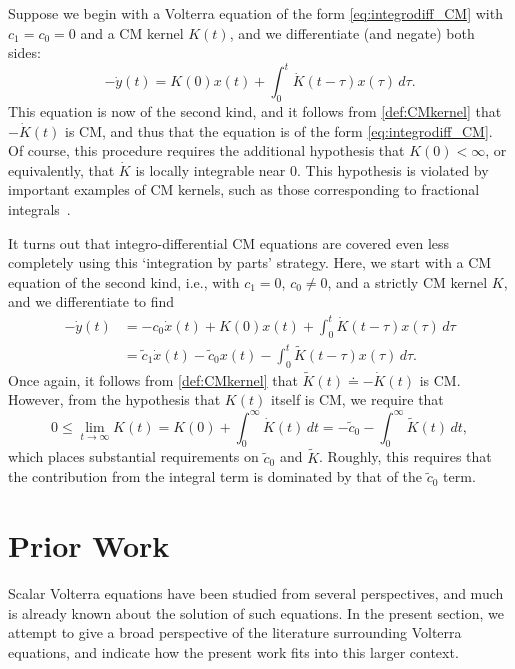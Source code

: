\documentclass{cams-l} %
\theoremstyle{definition}
\theoremstyle{remark}
\numberwithin{equation}{section}
\begin{document}
Suppose we begin with a Volterra equation of the form \ref{eq:integrodiff_CM} with $c_1 = c_0 = 0$ and a CM kernel $K(t)$, and we differentiate (and negate) both sides:
\begin{equation*}
    -\dot{y}(t) = K(0)x(t) + \int_{0}^t \dot{K}(t-\tau)x(\tau)\,d\tau.
\end{equation*}
This equation is now of the second kind, and it follows from \cref{def:CMkernel} that $-\dot{K}(t)$ is CM, and thus that the equation is of the form \ref{eq:integrodiff_CM}. Of course, this procedure requires the additional hypothesis that $K(0)<\infty$, or equivalently, that $\dot{K}$ is locally integrable near $0$. This hypothesis is violated by important examples of CM kernels, such as those corresponding to fractional integrals~\cite{2014fcip.book.....H}.

It turns out that integro-differential CM equations are covered even less completely using this `integration by parts' strategy. Here, we start with a CM equation of the second kind, i.e., with $c_1=0$, $c_0\neq 0$, and a strictly CM kernel $K$, and we differentiate to find
\begin{align*}
    -\dot{y}(t) &= -c_0\dot{x}(t) + K(0)x(t) + \int_{0}^t \dot{K}(t-\tau)x(\tau)\,d\tau \\
    &= \widetilde{c}_1\dot{x}(t) - \widetilde{c}_0x(t) - \int_0^t\widetilde{K}(t-\tau)x(\tau)\,d\tau.
\end{align*}
Once again, it follows from \cref{def:CMkernel} that $\widetilde{K}(t) \doteq -\dot{K}(t)$ is CM. However, from the hypothesis that $K(t)$ itself is CM, we require that
\[0\leq \lim_{t\to\infty} K(t) = K(0) + \int_0^\infty \dot{K}(t)\,dt = -\widetilde{c}_0 - \int_0^\infty \widetilde{K}(t)\,dt,\]
which places substantial requirements on $\widetilde{c}_0$ and $\widetilde{K}$. Roughly, this requires that the contribution from the integral term is dominated by that of the $\widetilde{c}_0$ term.
\davebegin
\section{Prior Work}\label{sec:history}
Scalar Volterra equations have been studied from several perspectives, and much is already known about the solution of such equations. In the present section, we attempt to give a broad perspective of the literature surrounding Volterra equations, and indicate how the present work fits into this larger context. 
\end{document}
